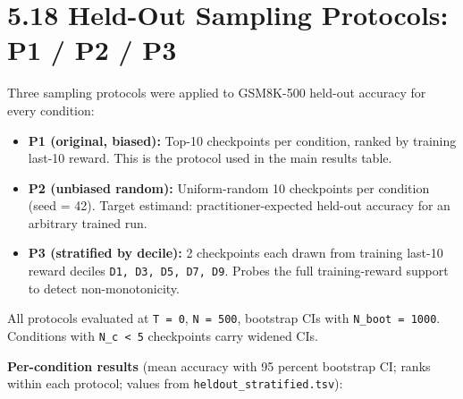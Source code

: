 \documentclass[
  american,
  11pt,
  a4paper,
  oneside]{report}
\providecommand{\tightlist}{%
  \setlength{\itemsep}{0pt}\setlength{\parskip}{0pt}}
\begin{document}
\section{5.18 Held-Out Sampling Protocols: P1 / P2 /
P3}\label{held-out-sampling-protocols-p1-p2-p3}

Three sampling protocols were applied to GSM8K-500 held-out accuracy for
every condition:

\begin{itemize}
\tightlist
\item
  \textbf{P1 (original, biased):} Top-10 checkpoints per condition,
  ranked by training last-10 reward. This is the protocol used in the
  main results table.
\item
  \textbf{P2 (unbiased random):} Uniform-random 10 checkpoints per
  condition (seed = 42). Target estimand: practitioner-expected held-out
  accuracy for an arbitrary trained run.
\item
  \textbf{P3 (stratified by decile):} 2 checkpoints each drawn from
  training last-10 reward deciles \texttt{D1,\ D3,\ D5,\ D7,\ D9}.
  Probes the full training-reward support to detect non-monotonicity.
\end{itemize}

All protocols evaluated at \texttt{T\ =\ 0}, \texttt{N\ =\ 500},
bootstrap CIs with \texttt{N\_boot\ =\ 1000}. Conditions with
\texttt{N\_c\ \textless{}\ 5} checkpoints carry widened CIs.

\textbf{Per-condition results} (mean accuracy with 95 percent bootstrap
CI; ranks within each protocol; values from
\texttt{heldout\_stratified.tsv}):
\end{document}
